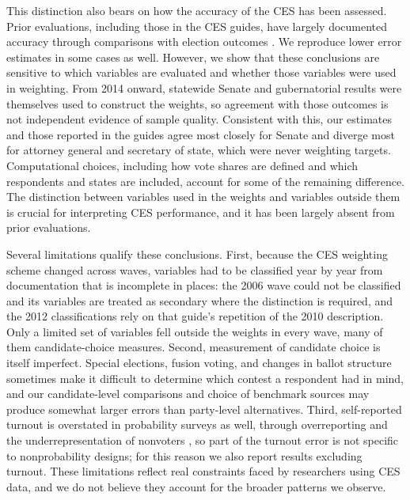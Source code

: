 \documentclass[12pt]{article}
\begin{document}
This distinction also bears on how the accuracy of the CES has been assessed. Prior evaluations, including those in the CES guides, have largely documented accuracy through comparisons with election outcomes \parencite{ansolabehere_cooperative_2013, ansolabehere_does_2014, rivers_inference_2009, vavreck_2006_2008}. We reproduce lower error estimates in some cases as well. However, we show that these conclusions are sensitive to which variables are evaluated and whether those variables were used in weighting. From 2014 onward, statewide Senate and gubernatorial results were themselves used to construct the weights, so agreement with those outcomes is not independent evidence of sample quality. Consistent with this, our estimates and those reported in the guides agree most closely for Senate and diverge most for attorney general and secretary of state, which were never weighting targets. Computational choices, including how vote shares are defined and which respondents and states are included, account for some of the remaining difference. The distinction between variables used in the weights and variables outside them is crucial for interpreting CES performance, and it has been largely absent from prior evaluations.

Several limitations qualify these conclusions. First, because the CES weighting scheme changed across waves, variables had to be classified year by year from documentation that is incomplete in places: the 2006 wave could not be classified and its variables are treated as secondary where the distinction is required, and the 2012 classifications rely on that guide's repetition of the 2010 description. Only a limited set of variables fell outside the weights in every wave, many of them candidate-choice measures. Second, measurement of candidate choice is itself imperfect. Special elections, fusion voting, and changes in ballot structure sometimes make it difficult to determine which contest a respondent had in mind, and our candidate-level comparisons and choice of benchmark sources may produce somewhat larger errors than party-level alternatives. Third, self-reported turnout is overstated in probability surveys as well, through overreporting and the underrepresentation of nonvoters \parencite{debell_turnout_2020, hammer_experiments_2014}, so part of the turnout error is not specific to nonprobability designs; for this reason we also report results excluding turnout. These limitations reflect real constraints faced by researchers using CES data, and we do not believe they account for the broader patterns we observe.
\end{document}
